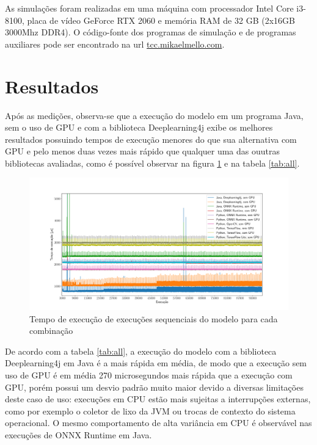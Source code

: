 As simulações foram realizadas em uma máquina com processador Intel Core i3-8100, placa de vídeo GeForce RTX 2060 e memória RAM de 32 GB (2x16GB 3000Mhz DDR4). O código-fonte dos programas de simulação e de programas auxiliares pode ser encontrado na url \url{tcc.mikaelmello.com}.

\section{Resultados}

Após as medições, observa-se que a execução do modelo em um programa Java, sem o uso de GPU e com a biblioteca Deeplearning4j exibe os melhores resultados possuindo tempos de execução menores do que sua alternativa com GPU e pelo menos duas vezes mais rápido que qualquer uma das ouutras bibliotecas avaliadas, como é possível observar na figura \ref{fig:all} e na tabela \ref{tab:all}.

\begin{figure}[h]
  \centerline{\includegraphics[width=\paperwidth]{img/all.pdf}}
  \caption{Tempo de execução de execuções sequenciais do modelo para cada combinação}
  \label{fig:all}
\end{figure}

De acordo com a tabela \ref{tab:all}, a execução do modelo com a biblioteca Deeplearning4j em Java é a mais rápida em média, de modo que a execução sem uso de GPU é em média 270 microsegundos mais rápida que a execução com GPU, porém possui um desvio padrão muito maior devido a diversas limitações deste caso de uso: execuções em CPU estão mais sujeitas a interrupções externas, como por exemplo o coletor de lixo da JVM ou trocas de contexto do sistema operacional. O mesmo comportamento de alta variância em CPU é observável nas execuções de ONNX Runtime em Java.

